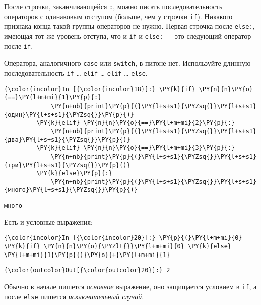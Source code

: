     После строчки, заканчивающейся \texttt{:}, можно писать
последовательность операторов с одинаковым отступом (больше, чем у
строчки \texttt{if}). Никакого признака конца такой группы операторов не
нужно. Первая строчка после \texttt{else:}, имеющая тот же уровень
отступа, что и \texttt{if} и \texttt{else:} --- это следующий оператор
после \texttt{if}.

Оператора, аналогичного \texttt{case} или \texttt{switch}, в питоне нет.
Используйте длинную последовательность \texttt{if} \ldots{}
\texttt{elif} \ldots{} \texttt{elif} \ldots{} \texttt{else}.

    \begin{Verbatim}[commandchars=\\\{\}]
{\color{incolor}In [{\color{incolor}18}]:} \PY{k}{if} \PY{n}{n}\PY{o}{==}\PY{l+m+mi}{1}\PY{p}{:}
             \PY{n+nb}{print}\PY{p}{(}\PY{l+s+s1}{\PYZsq{}}\PY{l+s+s1}{один}\PY{l+s+s1}{\PYZsq{}}\PY{p}{)}
         \PY{k}{elif} \PY{n}{n}\PY{o}{==}\PY{l+m+mi}{2}\PY{p}{:}
             \PY{n+nb}{print}\PY{p}{(}\PY{l+s+s1}{\PYZsq{}}\PY{l+s+s1}{два}\PY{l+s+s1}{\PYZsq{}}\PY{p}{)}
         \PY{k}{elif} \PY{n}{n}\PY{o}{==}\PY{l+m+mi}{3}\PY{p}{:}
             \PY{n+nb}{print}\PY{p}{(}\PY{l+s+s1}{\PYZsq{}}\PY{l+s+s1}{три}\PY{l+s+s1}{\PYZsq{}}\PY{p}{)}
         \PY{k}{else}\PY{p}{:}
             \PY{n+nb}{print}\PY{p}{(}\PY{l+s+s1}{\PYZsq{}}\PY{l+s+s1}{много}\PY{l+s+s1}{\PYZsq{}}\PY{p}{)}
\end{Verbatim}

    \begin{Verbatim}[commandchars=\\\{\}]
много

    \end{Verbatim}

    Есть и условные выражения:

    \begin{Verbatim}[commandchars=\\\{\}]
{\color{incolor}In [{\color{incolor}20}]:} \PY{p}{(}\PY{l+m+mi}{0} \PY{k}{if} \PY{n}{n}\PY{o}{\PYZlt{}}\PY{l+m+mi}{0} \PY{k}{else} \PY{l+m+mi}{1}\PY{p}{)}\PY{o}{+}\PY{l+m+mi}{1}
\end{Verbatim}

            \begin{Verbatim}[commandchars=\\\{\}]
{\color{outcolor}Out[{\color{outcolor}20}]:} 2
\end{Verbatim}
        
    Обычно в начале пишется \emph{основное} выражение, оно защищается
условием в \texttt{if}, а после \texttt{else} пишется
\emph{исключительный случай}.

